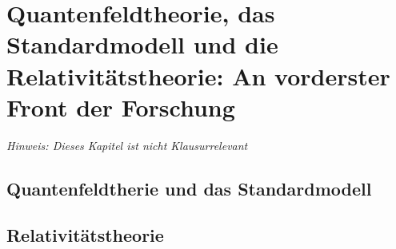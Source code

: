 
\chapter{Quantenfeldtheorie, das Standardmodell und die Relativitätstheorie: An vorderster Front der Forschung}
\label{chapter-qmrt}

\textit{Hinweis: Dieses Kapitel ist nicht Klausurrelevant}

\section{Quantenfeldtherie und das Standardmodell}
\lipsum[1]
\section{Relativitätstheorie}
\lipsum[1]